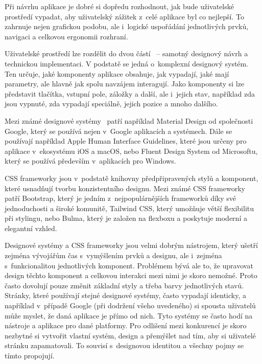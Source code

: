Při návrhu aplikace je dobré si dopředu rozhodnout, jak bude uživatelské prostředí vypadat, aby uživatelský zážitek z~celé aplikace byl co nejlepší. 
To zahrnuje nejen grafickou podobu, ale i~logické uspořádání jednotlivých prvků, navigaci a celkovou ergonomii rozhraní.

Uživatelské prostředí lze rozdělit do dvou částí~\cite{kholmatova_2017} -- samotný designový návrh a technickou implementaci. 
V podstatě se jedná o~komplexní designový systém. 
Ten určuje, jaké komponenty aplikace obsahuje, jak vypadají, jaké mají parametry, ale hlavně jak spolu navzájem interagují. 
Jako komponenty si lze představit tlačítka, vstupní pole, záložky a další, ale i~jejich stav, například zda jsou vypnuté, zda vypadají speciálně, jejich pozice a mnoho dalšího.

Mezi známé designové systémy~\cite{uzayr2022frontend, kholmatova_2017, tidwell_2019} patří například Material Design od společnosti Google, který se používá nejen v~Google aplikacích a systémech. 
Dále se používají například Apple Human Interface Guidelines, které jsou určeny pro aplikace v~ekosystému iOS a macOS, nebo Fluent Design System od Microsoftu, který se používá především v~aplikacích pro Windows.

CSS frameworky jsou v~podstatě knihovny předpřipravených stylů a komponent, které usnadňují tvorbu konzistentního designu. 
Mezi známé CSS frameworky patří Bootstrap, který je jedním z~nejpopulárnějších frameworků díky své jednoduchosti a široké komunitě, Tailwind CSS, který umožňuje větší flexibilitu při stylingu, nebo Bulma, který je založen na flexboxu a poskytuje moderní a elegantní vzhled.

Designové systémy a CSS frameworky jsou velmi dobrým nástrojem, který ušetří zejména vývojářům čas s~vymýšlením prvků a designu, ale i~zejména s~funkcionalitou jednotlivých komponent. 
Problémem bývá ale to, že upravovat design těchto komponent a celkovou interakci mezi nimi je skoro nemožné. 
Proto často dovolují pouze změnit základní styly a třeba barvy jednotlivých stavů. 
Stránky, které používají stejné designové systémy, často vypadají identicky, a například v~případě Google (při dodržení všeho uvedeného) si spousta uživatelů může myslet, že daná aplikace je přímo od nich. 
Tyto systémy se často hodí na nástroje a aplikace pro dané platformy.
Pro odlišení mezi konkurencí je skoro nezbytné si vytvořit vlastní systém, design a přemýšlet nad tím, aby si uživatelé stránku zapamatovali. 
To souvisí s~designovou identitou a všechny pojmy se tímto propojují.

